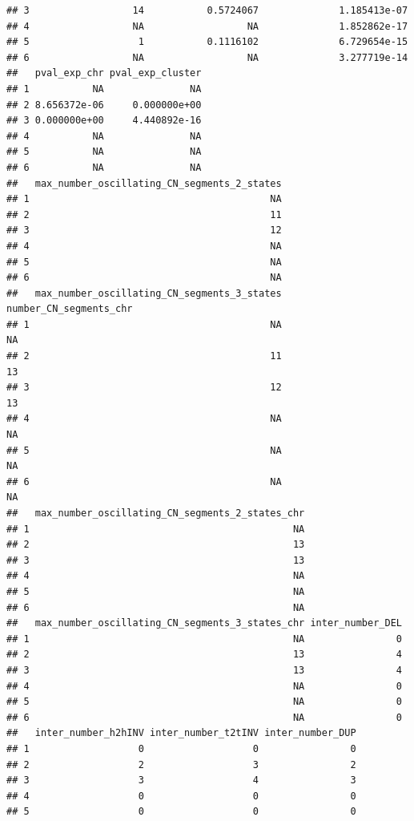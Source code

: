 \documentclass[twoside,a4wide,11pt]{article}\usepackage[]{graphicx}\usepackage[]{color}
\makeatletter
\newenvironment{kframe}{%
 \def\at@end@of@kframe{}%
 \ifinner\ifhmode%
  \def\at@end@of@kframe{\end{minipage}}%
  \begin{minipage}{\columnwidth}%
 \fi\fi%
 \def\FrameCommand##1{\hskip\@totalleftmargin \hskip-\fboxsep
 \colorbox{shadecolor}{##1}\hskip-\fboxsep
     \hskip-\linewidth \hskip-\@totalleftmargin \hskip\columnwidth}%
 \MakeFramed {\advance\hsize-\width
   \@totalleftmargin\z@ \linewidth\hsize
   \@setminipage}}%
 {\par\unskip\endMakeFramed%
 \at@end@of@kframe}
\newenvironment{knitrout}{}{} %
\makeatother
\begin{document}
\begin{knitrout}
\begin{kframe}
\begin{verbatim}
## 3                  14           0.5724067              1.185413e-07
## 4                  NA                  NA              1.852862e-17
## 5                   1           0.1116102              6.729654e-15
## 6                  NA                  NA              3.277719e-14
##   pval_exp_chr pval_exp_cluster
## 1           NA               NA
## 2 8.656372e-06     0.000000e+00
## 3 0.000000e+00     4.440892e-16
## 4           NA               NA
## 5           NA               NA
## 6           NA               NA
##   max_number_oscillating_CN_segments_2_states
## 1                                          NA
## 2                                          11
## 3                                          12
## 4                                          NA
## 5                                          NA
## 6                                          NA
##   max_number_oscillating_CN_segments_3_states number_CN_segments_chr
## 1                                          NA                     NA
## 2                                          11                     13
## 3                                          12                     13
## 4                                          NA                     NA
## 5                                          NA                     NA
## 6                                          NA                     NA
##   max_number_oscillating_CN_segments_2_states_chr
## 1                                              NA
## 2                                              13
## 3                                              13
## 4                                              NA
## 5                                              NA
## 6                                              NA
##   max_number_oscillating_CN_segments_3_states_chr inter_number_DEL
## 1                                              NA                0
## 2                                              13                4
## 3                                              13                4
## 4                                              NA                0
## 5                                              NA                0
## 6                                              NA                0
##   inter_number_h2hINV inter_number_t2tINV inter_number_DUP
## 1                   0                   0                0
## 2                   2                   3                2
## 3                   3                   4                3
## 4                   0                   0                0
## 5                   0                   0                0

\end{verbatim}
\end{kframe}
\end{knitrout}
\end{document}
